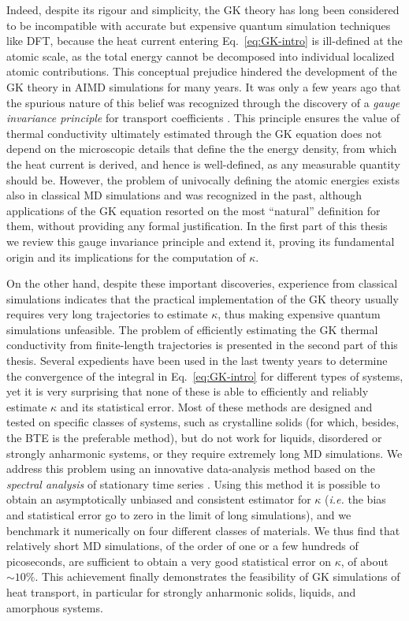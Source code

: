 Indeed, despite its rigour and simplicity, the GK theory has long been considered to be incompatible with accurate but expensive quantum simulation techniques like DFT, because the heat current entering Eq.~\eqref{eq:GK-intro} is ill-defined at the atomic scale, as the total energy cannot be decomposed into individual localized atomic contributions. 
This conceptual prejudice hindered the development of the GK theory in AIMD simulations for many years. It was only a few years ago that the spurious nature of this belief was recognized through the discovery of a \emph{gauge invariance principle} for transport coefficients \cite{Marcolongo2016,Ercole2016}. 
This principle ensures the value of thermal conductivity ultimately estimated through the GK equation does not depend on the microscopic details that define the the energy density, from which the heat current is derived, and hence is well-defined, as any measurable quantity should be. 
However, the problem of univocally defining the atomic energies exists also in classical MD simulations and was recognized in the past, although applications of the GK equation resorted on the most ``natural'' definition for them, without providing any formal justification. 
In the first part of this thesis we review this gauge invariance principle and extend it, proving its fundamental origin and its implications for the computation of $\kappa$.

On the other hand, despite these important discoveries, experience from classical simulations indicates that the practical implementation of the GK theory usually requires very long trajectories to estimate $\kappa$, thus making expensive quantum simulations unfeasible. 
The problem of efficiently estimating the GK thermal conductivity from finite-length trajectories is presented in the second part of this thesis. 
Several expedients have been used in the last twenty years to determine the convergence of the integral in Eq.~\eqref{eq:GK-intro} for different types of systems, yet it is very surprising that none of these is able to efficiently and reliably estimate $\kappa$ and its statistical error. Most of these methods are designed and tested on specific classes of systems, such as crystalline solids (for which, besides, the BTE is the preferable method), but do not work for liquids, disordered or strongly anharmonic systems, or they require extremely long MD simulations. 
We address this problem using an innovative data-analysis method based on the \emph{spectral analysis} of stationary time series \cite{Ercole2017}. Using this method it is possible to obtain an asymptotically unbiased and consistent estimator for $\kappa$ (\emph{i.e.} the bias and statistical error go to zero in the limit of long simulations), and we benchmark it numerically on four different classes of materials. We thus find that relatively short MD simulations, of the order of one or a few hundreds of picoseconds, are sufficient to obtain a very good statistical error on $\kappa$, of about $\sim 10\%$. This achievement finally demonstrates the feasibility of \abinitio GK simulations of heat transport, in particular for strongly anharmonic solids, liquids, and amorphous systems. 

